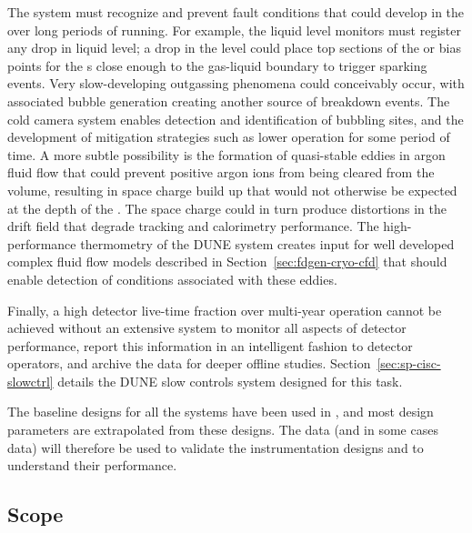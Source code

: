 The  system must recognize and prevent fault conditions that could develop in the  over long periods of running.  For example, the liquid level monitors must register any drop in liquid level; a drop in the level could place top sections of the  or bias  points  for the s close enough to the gas-liquid boundary to trigger sparking events. %
Very slow-developing outgassing phenomena could conceivably occur, with associated bubble generation creating another source of  breakdown events.  The cold camera system enables detection and identification of bubbling sites, and the development of mitigation strategies such as lower  operation for some period of time.  A more subtle possibility is the formation of quasi-stable eddies in argon fluid flow that could prevent positive argon ions from being cleared from the  volume, resulting in space charge build up that would not otherwise be expected at the depth of the .  The space charge could in turn produce distortions in the  drift field that degrade tracking and calorimetry performance.  The high-performance thermometry  of the DUNE  system creates input for well developed complex fluid flow models described in Section~\ref{sec:fdgen-cryo-cfd} that should enable detection of  conditions associated with these eddies.
 
Finally, a high detector live-time fraction over multi-year operation cannot be achieved without an extensive system to monitor all aspects of detector performance, report this information in an intelligent fashion to detector operators, and archive the data for deeper offline studies.  Section~\ref{sec:sp-cisc-slowctrl} details the DUNE slow controls system designed for this task.
 
The baseline designs for all the  systems have been used in , %
and most design
parameters are extrapolated from these designs. The  data (and in some cases  data) will therefore be used to validate the instrumentation designs and to understand their performance.

\subsection{Scope}

